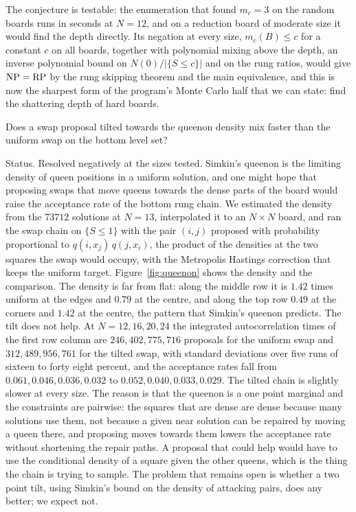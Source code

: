 The conjecture is testable: the enumeration that found $m_c = 3$ on the random boards runs in seconds at $N = 12$, and on a reduction board of moderate size it would find the depth directly. Its negation at every size, $m_c(B) \le c$ for a constant $c$ on all boards, together with polynomial mixing above the depth, an inverse polynomial bound on $N(0) / |\{ S \le c \}|$ and on the rung ratios, would give $\mathrm{NP} = \mathrm{RP}$ by the rung skipping theorem and the main equivalence, and this is now the sharpest form of the program's Monte Carlo half that we can state: find the shattering depth of hard boards.

\begin{problem}
Does a swap proposal tilted towards the queenon density mix faster than the uniform swap on the bottom level set?
\end{problem}

Status. Resolved negatively at the sizes tested. Simkin's queenon is the limiting density of queen positions in a uniform solution, and one might hope that proposing swaps that move queens towards the dense parts of the board would raise the acceptance rate of the bottom rung chain. We estimated the density from the $73712$ solutions at $N = 13$, interpolated it to an $N \times N$ board, and ran the swap chain on $\{ S \le 1 \}$ with the pair $(i, j)$ proposed with probability proportional to $q(i, x_j) \, q(j, x_i)$, the product of the densities at the two squares the swap would occupy, with the Metropolis Hastings correction that keeps the uniform target. Figure~\ref{fig:queenon} shows the density and the comparison. The density is far from flat: along the middle row it is $1.42$ times uniform at the edges and $0.79$ at the centre, and along the top row $0.49$ at the corners and $1.42$ at the centre, the pattern that Simkin's queenon predicts. The tilt does not help. At $N = 12, 16, 20, 24$ the integrated autocorrelation times of the first row column are $246, 402, 775, 716$ proposals for the uniform swap and $312, 489, 956, 761$ for the tilted swap, with standard deviations over five runs of sixteen to forty eight percent, and the acceptance rates fall from $0.061, 0.046, 0.036, 0.032$ to $0.052, 0.040, 0.033, 0.029$. The tilted chain is slightly slower at every size. The reason is that the queenon is a one point marginal and the constraints are pairwise: the squares that are dense are dense because many solutions use them, not because a given near solution can be repaired by moving a queen there, and proposing moves towards them lowers the acceptance rate without shortening the repair paths. A proposal that could help would have to use the conditional density of a square given the other queens, which is the thing the chain is trying to sample. The problem that remains open is whether a two point tilt, using Simkin's bound on the density of attacking pairs, does any better; we expect not.

